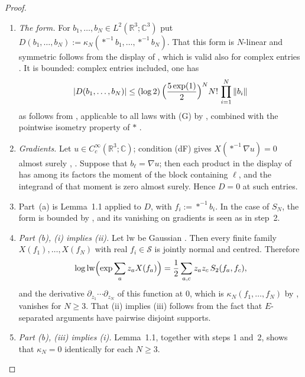 \documentclass[11pt]{amsart}
\theoremstyle{definition}
\begin{document}
\begin{proof}
\begin{enumerate}
\item[1.] \emph{The form.}
For $b_1,\dots,b_N\in L^2(\mathbb{R}^3;\mathbb{C}^3)$ put $D(b_1,\dots,b_N):=\kappa_N(\ast^{-1}b_1,\dots,\ast^{-1}b_N)$.
That this form is $N$-linear and symmetric follows from the display of \cite[Notation~(n5)]{QEDIII}, which is valid also for complex entries \cite[Notation~(n8); Chapter~45-1, Part~F, Lemma~F.1]{QEDIII}.
It is bounded: complex entries included, one has
\begin{equation*}
|D(b_1,\dots,b_N)|\le(\log2)\,\Bigl(\frac{5\exp(1)}{2}\Bigr)^{N}N!\,\prod_{i=1}^{N}\|b_i\|
\end{equation*}
as follows from \cite[Proposition~7.10\,(7)]{QEDI}, applicable to all laws with (G) by \cite[Proposition~45.1\,(1),~(11)]{QEDIII}, combined with the pointwise isometry property of $\ast$ \cite[Definition~14.1]{QEDII}.
\item[2.] \emph{Gradients.}
Let $u\in C_c^\infty(\mathbb{R}^3;\mathbb{C})$; condition (dF) gives $X(\ast^{-1}\nabla u)=0$ almost surely \cite[Definition~14.2\,(a)]{QEDII}, \cite[Proposition~45.1\,(10)]{QEDIII}.
Suppose that $b_\ell=\nabla u$; then each product in the display of \cite[Notation~(n5)]{QEDIII} has among its factors the moment of the block containing $\ell$, and the integrand of that moment is zero almost surely.
Hence $D=0$ at such entries.
\item[3.]
Part~(a) is Lemma~1.1 applied to $D$, with $f_i:=\ast^{-1}b_i$.
In the case of $S_N$, the form is bounded by \cite[Lemma~14.3\,(b)]{QEDII}, and its vanishing on gradients is seen as in step~2.
\item[4.] \emph{Part (b), (i) implies (ii).}
Let $\mathrm{lw}$ be Gaussian \cite[Notation~(n6)]{QEDIII}.
Then every finite family $X(f_1),\dots,X(f_N)$ with real $f_i\in\mathcal S$ is jointly normal \cite[Section~2.5]{QEDI} and centred.
Therefore
\begin{equation*}
\log\mathrm{lw}\Bigl(\exp\sum_az_aX(f_a)\Bigr)=\frac12\sum_{a,c}z_az_c\,S_2(f_a,f_c),
\end{equation*}
and the derivative $\partial_{z_1}\cdots\partial_{z_N}$ of this function at $0$, which is $\kappa_N(f_1,\dots,f_N)$ by \cite[Notation~(n5)]{QEDIII}, vanishes for $N\ge3$.
That (ii) implies (iii) follows from the fact that $E$-separated arguments have pairwise disjoint supports.
\item[5.] \emph{Part (b), (iii) implies (i).}
Lemma~1.1, together with steps 1 and~2, shows that $\kappa_N=0$ identically for each $N\ge3$.

\end{enumerate}
\end{proof}
\end{document}
